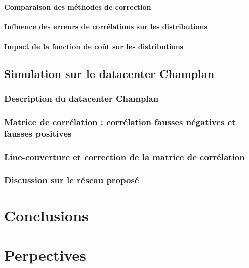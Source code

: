\documentclass[onecolumn, 12pt]{book}
\begin{document}
			\subsubsection{Comparaison des m\'ethodes de correction}
			\subsubsection{Influence des erreurs de corr\'elations sur les distributions}
			\subsubsection{Impact de la fonction de co\^ut sur les distributions}
	\section{Simulation sur le datacenter Champlan}
		\subsection{Description du datacenter Champlan}
		\subsection{Matrice de corr\'elation : corr\'elation fausses n\'egatives et fausses positives}
		\subsection{Line-couverture et correction de la matrice de corr\'elation}
		\subsection{Discussion sur le r\'eseau propos\'e}
	
\chapter{Conclusions}
\chapter{Perpectives}
\tableofcontents
 
\end{document}
